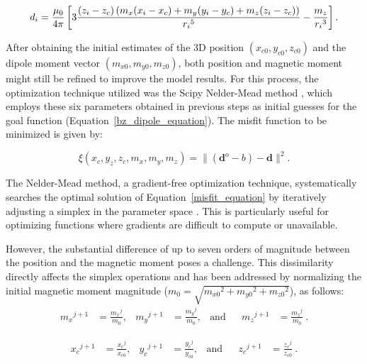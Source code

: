    \begin{equation}
        \small
        \label{bz_dipole_equation}
        {d}_{i} = \frac{\mu_0}{4 \pi} \left [ 3 \frac{ (z_i-z_c) \left ( m_x (x_i-x_c) + m_y (y_i-y_c) + m_z (z_i-z_c) \right )}{{r_i}^5} - \frac{m_z}{{r_i}^3} \right ] .
    \end{equation}
    
     After obtaining the initial estimates of the 3D position $(x_{c0}, y_{c0}, z_{c0})$ and the dipole moment vector $(m_{x0}, m_{y0}, m_{z0})$, both position and magnetic moment might still be refined to improve the model results. For this process, the optimization technique utilized was the Scipy Nelder-Mead method \citep{2020SciPy-NMeth}, which employs these six parameters obtained in previous steps as initial guesses for the goal function (Equation~\ref{bz_dipole_equation}). The misfit function to be minimized is given by:
    
    \begin{equation}
    \label{misfit_equation}
    \xi (x_c, y_z, z_c, m_x, m_y, m_z) = \| (\mathbf{d}^{o}-b) - \mathbf{d} \|^2.
    \end{equation} 
    
     The Nelder-Mead method, a gradient-free optimization technique, systematically searches the optimal solution of Equation~\ref{misfit_equation} by iteratively adjusting a simplex in the parameter space \citep{Nelder-Mead1965}. This is particularly useful for optimizing functions where gradients are difficult to compute or unavailable. 
     
     However, the substantial difference of up to seven orders of magnitude between the position and the magnetic moment poses a challenge. This dissimilarity directly affects the simplex operations and has been addressed by normalizing the initial magnetic moment magnitude ($m_0 = \sqrt{{m_{x0}}^2+{m_{y0}}^2+{m_{z0}}^2}$), as follows:
     \begin{align}
    \label{normalizing_m_parameters}
    {m_x}^{j+1} &= \frac{{m_x}^{j}}{m_0}, & {m_y}^{j+1} &= \frac{{m_y}^{j}}{m_0}, & \text{and} & &{m_z}^{j+1} &= \frac{{m_z}^{j}}{m_0}
    \ .
    \end{align}
     
     \begin{align}
    \label{normalizing_h_parameters}
    {x_c}^{j+1} &= \frac{{x_c}^{j}}{x_{c0}}, & {y_c}^{j+1} &= \frac{{y_c}^{j}}{y_{c0}}, & \text{and} & &{z_c}^{j+1} &= \frac{{z_c}^{j}}{z_{c0}}
    \ .
    \end{align}
    
